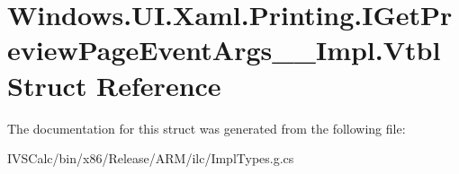 \hypertarget{struct_windows_1_1_u_i_1_1_xaml_1_1_printing_1_1_i_get_preview_page_event_args_____impl_1_1_vtbl}{}\section{Windows.\+U\+I.\+Xaml.\+Printing.\+I\+Get\+Preview\+Page\+Event\+Args\+\_\+\+\_\+\+Impl.\+Vtbl Struct Reference}
\label{struct_windows_1_1_u_i_1_1_xaml_1_1_printing_1_1_i_get_preview_page_event_args_____impl_1_1_vtbl}


The documentation for this struct was generated from the following file\+:\begin{DoxyCompactItemize}
\item 
I\+V\+S\+Calc/bin/x86/\+Release/\+A\+R\+M/ilc/Impl\+Types.\+g.\+cs\end{DoxyCompactItemize}
